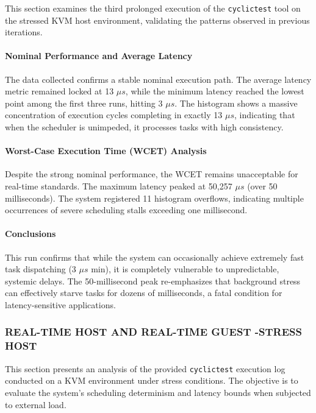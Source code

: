 This section examines the third prolonged execution of the
\texttt{cyclictest} tool on the stressed KVM host environment,
validating the patterns observed in previous iterations.

\paragraph{Nominal Performance and Average
Latency}\label{nominal-performance-and-average-latency-4}

The data collected confirms a stable nominal execution path. The average
latency metric remained locked at 13 $\mu s$, while the minimum latency
reached the lowest point among the first three runs, hitting 3 $\mu s$. The
histogram shows a massive concentration of execution cycles completing
in exactly 13 $\mu s$, indicating that when the scheduler is unimpeded, it
processes tasks with high consistency.

\paragraph{Worst-Case Execution Time (WCET)
Analysis}\label{worst-case-execution-time-wcet-analysis-4}

Despite the strong nominal performance, the WCET remains unacceptable
for real-time standards. The maximum latency peaked at 50,257 $\mu s$ (over
50 milliseconds). The system registered 11 histogram overflows,
indicating multiple occurrences of severe scheduling stalls exceeding
one millisecond.

\paragraph{Conclusions}\label{conclusions-2}

This run confirms that while the system can occasionally achieve
extremely fast task dispatching (3 $\mu s$ min), it is completely vulnerable
to unpredictable, systemic delays. The 50-millisecond peak re-emphasizes
that background stress can effectively starve tasks for dozens of
milliseconds, a fatal condition for latency-sensitive applications.

\subsubsection{REAL-TIME HOST AND REAL-TIME GUEST -STRESS
HOST}\label{real-time-host-and-real-time-guest--stress-host}

This section presents an analysis of the provided \texttt{cyclictest}
execution log conducted on a KVM environment under stress conditions.
The objective is to evaluate the system's scheduling determinism and
latency bounds when subjected to external load.

